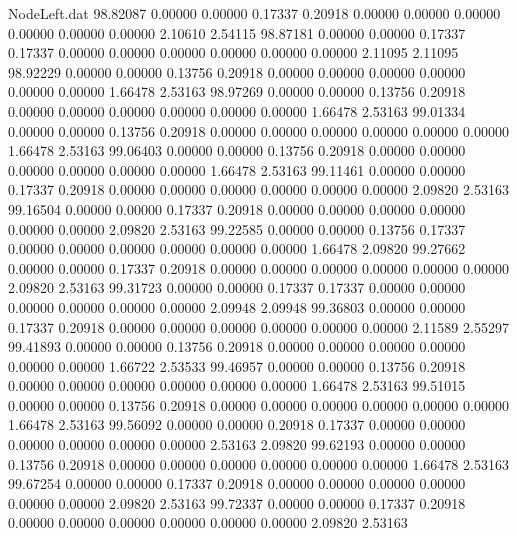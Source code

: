 \begin{filecontents}{NodeLeft.dat}
  98.82087    0.00000    0.00000     0.17337    0.20918    0.00000    0.00000    0.00000    0.00000    0.00000    0.00000    2.10610    2.54115
  98.87181    0.00000    0.00000     0.17337    0.17337    0.00000    0.00000    0.00000    0.00000    0.00000    0.00000    2.11095    2.11095
  98.92229    0.00000    0.00000     0.13756    0.20918    0.00000    0.00000    0.00000    0.00000    0.00000    0.00000    1.66478    2.53163
  98.97269    0.00000    0.00000     0.13756    0.20918    0.00000    0.00000    0.00000    0.00000    0.00000    0.00000    1.66478    2.53163
  99.01334    0.00000    0.00000     0.13756    0.20918    0.00000    0.00000    0.00000    0.00000    0.00000    0.00000    1.66478    2.53163
  99.06403    0.00000    0.00000     0.13756    0.20918    0.00000    0.00000    0.00000    0.00000    0.00000    0.00000    1.66478    2.53163
  99.11461    0.00000    0.00000     0.17337    0.20918    0.00000    0.00000    0.00000    0.00000    0.00000    0.00000    2.09820    2.53163
  99.16504    0.00000    0.00000     0.17337    0.20918    0.00000    0.00000    0.00000    0.00000    0.00000    0.00000    2.09820    2.53163
  99.22585    0.00000    0.00000     0.13756    0.17337    0.00000    0.00000    0.00000    0.00000    0.00000    0.00000    1.66478    2.09820
  99.27662    0.00000    0.00000     0.17337    0.20918    0.00000    0.00000    0.00000    0.00000    0.00000    0.00000    2.09820    2.53163
  99.31723    0.00000    0.00000     0.17337    0.17337    0.00000    0.00000    0.00000    0.00000    0.00000    0.00000    2.09948    2.09948
  99.36803    0.00000    0.00000     0.17337    0.20918    0.00000    0.00000    0.00000    0.00000    0.00000    0.00000    2.11589    2.55297
  99.41893    0.00000    0.00000     0.13756    0.20918    0.00000    0.00000    0.00000    0.00000    0.00000    0.00000    1.66722    2.53533
  99.46957    0.00000    0.00000     0.13756    0.20918    0.00000    0.00000    0.00000    0.00000    0.00000    0.00000    1.66478    2.53163
  99.51015    0.00000    0.00000     0.13756    0.20918    0.00000    0.00000    0.00000    0.00000    0.00000    0.00000    1.66478    2.53163
  99.56092    0.00000    0.00000     0.20918    0.17337    0.00000    0.00000    0.00000    0.00000    0.00000    0.00000    2.53163    2.09820
  99.62193    0.00000    0.00000     0.13756    0.20918    0.00000    0.00000    0.00000    0.00000    0.00000    0.00000    1.66478    2.53163
  99.67254    0.00000    0.00000     0.17337    0.20918    0.00000    0.00000    0.00000    0.00000    0.00000    0.00000    2.09820    2.53163
  99.72337    0.00000    0.00000     0.17337    0.20918    0.00000    0.00000    0.00000    0.00000    0.00000    0.00000    2.09820    2.53163

\end{filecontents}
